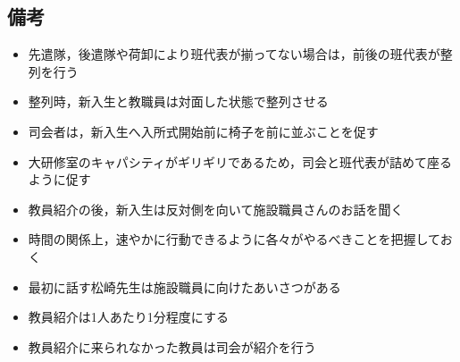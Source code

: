 \newpage

\subsection{備考}
\begin{itemize}
\item 先遣隊，後遣隊や荷卸により班代表が揃ってない場合は，前後の班代表が整列を行う
\item 整列時，新入生と教職員は対面した状態で整列させる
\item 司会者は，新入生へ入所式開始前に椅子を前に並ぶことを促す
\item 大研修室のキャパシティがギリギリであるため，司会と班代表が詰めて座るように促す
\item 教員紹介の後，新入生は反対側を向いて施設職員さんのお話を聞く
\item 時間の関係上，速やかに行動できるように各々がやるべきことを把握しておく
\item 最初に話す松崎先生は施設職員に向けたあいさつがある
\item 教員紹介は1人あたり1分程度にする
\item 教員紹介に来られなかった教員は司会が紹介を行う
\end{itemize}



%
